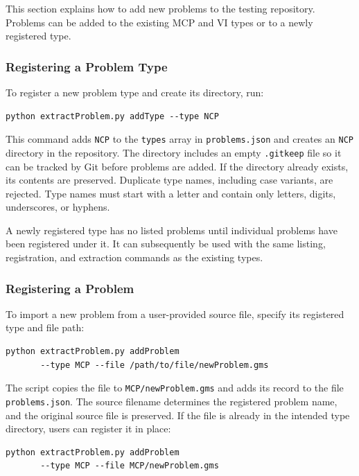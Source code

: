 This section explains how to add new problems to the testing repository. Problems can be added to the existing MCP and VI types or to a newly registered type.

\subsubsection{Registering a Problem Type}

To register a new problem type and create its directory, run:

\begin{verbatim}
python extractProblem.py addType --type NCP
\end{verbatim}

This command adds \texttt{NCP} to the \texttt{types} array in \texttt{problems.json} and creates an \texttt{NCP} directory in the repository. The directory includes an empty \texttt{.gitkeep} file so it can be tracked by Git before problems are added. If the directory already exists, its contents are preserved. Duplicate type names, including case variants, are rejected. Type names must start with a letter and contain only letters, digits, underscores, or hyphens.

A newly registered type has no listed problems until individual problems have been registered under it. It can subsequently be used with the same listing, registration, and extraction commands as the existing types.

\subsubsection{Registering a Problem}

To import a new problem from a user-provided source file, specify its registered type and file path:

\begin{verbatim}
python extractProblem.py addProblem 
       --type MCP --file /path/to/file/newProblem.gms
\end{verbatim}

The script copies the file to \texttt{MCP/newProblem.gms} and adds its record to the file \texttt{problems.json}. The source filename determines the registered problem name, and the original source file is preserved. If the file is already in the intended type directory, users can register it in place:

\begin{verbatim}
python extractProblem.py addProblem 
       --type MCP --file MCP/newProblem.gms
\end{verbatim}


